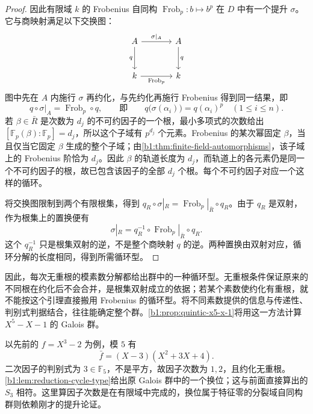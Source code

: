 \begin{proof}
	因此有限域 \(k\) 的 Frobenius 自同构 \(\operatorname{Frob}_p:b\mapsto b^p\) 在 \(D\) 中有一个提升 \(\sigma\)。它与商映射满足以下交换图：
	\[
		\begin{tikzcd}[row sep=large, column sep=large]
			A \arrow[r, "\sigma|_A"] \arrow[d, "q"'] & A \arrow[d, "q"] \\
			k \arrow[r, "\operatorname{Frob}_p"'] & k
		\end{tikzcd}
	\]
	图中先在 \(A\) 内施行 \(\sigma\) 再约化，与先约化再施行 Frobenius 得到同一结果，即
	\[
		q\circ\sigma|_A=\operatorname{Frob}_p\circ q, \qquad\text{即}\qquad q\bigl(\sigma(\alpha_i)\bigr)=q(\alpha_i)^p\quad(1\leq i\leq n).
	\]
	若 \(\beta\in\bar R\) 是次数为 \(d_j\) 的不可约因子的一个根，最小多项式的次数给出 \([\mathbb F_p(\beta):\mathbb F_p]=d_j\)，所以这个子域有 \(p^{d_j}\) 个元素。Frobenius 的某次幂固定 \(\beta\)，当且仅当它固定 \(\beta\) 生成的整个子域；由\cref{b1:thm:finite-field-automorphisms}，该子域上的 Frobenius 阶恰为 \(d_j\)。因此 \(\beta\) 的轨道长度为 \(d_j\)，而轨道上的各元素仍是同一个不可约因子的根，故已包含该因子的全部 \(d_j\) 个根。每个不可约因子对应一个这样的循环。

	将交换图限制到两个有限根集，得到 \(q_R\circ\sigma|_R=\operatorname{Frob}_p|_{\bar R}\circ q_R\)。由于 \(q_R\) 是双射，作为根集上的置换便有
	\[
		\sigma|_R=q_R^{-1}\circ\operatorname{Frob}_p|_{\bar R}\circ q_R.
	\]
	这个 \(q_R^{-1}\) 只是根集双射的逆，不是整个商映射 \(q\) 的逆。两种置换由双射对应，循环分解的长度相同，得到所需循环型。
\end{proof}

因此，每次无重根的模素数分解都给出群中的一种循环型。无重根条件保证原来的不同根在约化后不会合并，是根集双射成立的依据；若某个素数使约化有重根，就不能按这个引理直接搬用 Frobenius 的循环型。将不同素数提供的信息与传递性、判别式判据结合，往往能确定整个群。\cref{b1:prop:quintic-x5-x-1}将用这一方法计算 \(X^5-X-1\) 的 Galois 群。

\ProseParagraphBreak
以先前的 \(f=X^3-2\) 为例，模 \(5\) 有
\[
	\bar f=(X-3)(X^2+3X+4).
\]
二次因子的判别式为 \(3\in\mathbb F_5\)，不是平方，故因子次数为 \(1,2\)，且约化无重根。\cref{b1:lem:reduction-cycle-type}给出原 Galois 群中的一个换位；这与前面直接算出的 \(S_3\) 相符。这里算因子次数是在有限域中完成的，换位属于特征零的分裂域自同构群则依赖刚才的提升论证。
